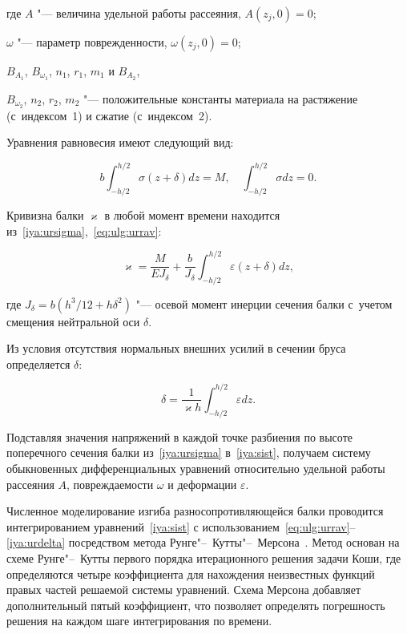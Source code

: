 где $A$ "--- величина удельной работы рассеяния, $A(z_j,0)=0$; 

$\omega$ "--- параметр поврежденности, $\omega(z_j,0)=0$;  

$B_{A_{1}}$, $B_{\omega_{1}}$,  $n_{1}$,  $r_{1}$,  $m_{1}$ и $B_{A_{2}}$, 

$B_{\omega_{2}}$,  $n_{2}$,  $r_{2}$,  $m_{2}$ "--- положительные константы материала на растяжение (с~индексом~1) и сжатие (с~индексом~2).







Уравнения равновесия  имеют следующий вид:

	\begin{equation}\label{eq:ulg:urrav}

		b\int_{-h/2}^{h/2}\sigma (z+\delta) dz=M, \quad  \int_{-h/2}^{h/2}\sigma  dz=0.

		\end{equation}

Кривизна балки $\varkappa$ в любой момент времени находится из~\eqref{iya:ursigma},~\eqref{eq:ulg:urrav}:

	\begin{equation}\label{iya:kappa}

		\varkappa=\frac{M}{E J_{\delta}}+\frac{b}{ J_{\delta}}\int_{-h/2}^{h/2} \varepsilon (z+\delta)  dz,

		\end{equation}

где $J_{\delta}=b(h^3/12+h  \delta^2)$ "--- осевой момент инерции сечения балки с~учетом смещения нейтральной оси $\delta$.

        

Из условия отсутствия нормальных внешних усилий в сечении бруса определяется $\delta$:

	\begin{equation}\label{iya:urdelta}

		\delta=\frac{1}{\varkappa h}\int_{-h/2}^{h/2}\varepsilon  dz.

		\end{equation}

Подставляя значения напряжений в каждой точке разбиения по высоте поперечного сечения балки из~\eqref{iya:ursigma} в~\eqref{iya:sist}, получаем систему обыкновенных дифференциальных уравнений   относительно  удельной работы рассеяния $A$, повреждаемости $\omega$ и деформации $\varepsilon$. 



Численное моделирование изгиба разносопротивляющейся балки проводится интегрированием уравнений~\eqref{iya:sist} с использованием~\eqref{eq:ulg:urrav}–\eqref{iya:urdelta} посредством метода Рунге"--~Кутты"--~Мерсона~\cite{iya:Runge}. Метод основан на схеме Рунге"--~Кутты первого порядка итерационного решения задачи Коши, где определяются четыре коэффициента для нахождения неизвестных функций правых частей решаемой системы  уравнений. Схема Мерсона добавляет дополнительный пятый коэффициент, что позволяет определять погрешность решения на каждом шаге интегрирования по времени. 



